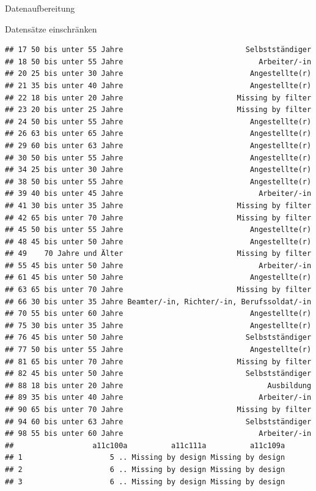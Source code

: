 \documentclass[ignorenonframetext,]{beamer}
\begin{document}
\begin{frame}[fragile]{Datenaufbereitung}
\begin{block}{Datensätze einschränken}
\begin{verbatim}
## 17 50 bis unter 55 Jahre                            Selbstständiger
## 18 50 bis unter 55 Jahre                               Arbeiter/-in
## 20 25 bis unter 30 Jahre                             Angestellte(r)
## 21 35 bis unter 40 Jahre                             Angestellte(r)
## 22 18 bis unter 20 Jahre                          Missing by filter
## 23 20 bis unter 25 Jahre                          Missing by filter
## 24 50 bis unter 55 Jahre                             Angestellte(r)
## 26 63 bis unter 65 Jahre                             Angestellte(r)
## 29 60 bis unter 63 Jahre                             Angestellte(r)
## 30 50 bis unter 55 Jahre                             Angestellte(r)
## 34 25 bis unter 30 Jahre                             Angestellte(r)
## 38 50 bis unter 55 Jahre                             Angestellte(r)
## 39 40 bis unter 45 Jahre                               Arbeiter/-in
## 41 30 bis unter 35 Jahre                          Missing by filter
## 42 65 bis unter 70 Jahre                          Missing by filter
## 45 50 bis unter 55 Jahre                             Angestellte(r)
## 48 45 bis unter 50 Jahre                             Angestellte(r)
## 49    70 Jahre und Älter                          Missing by filter
## 55 45 bis unter 50 Jahre                               Arbeiter/-in
## 61 45 bis unter 50 Jahre                             Angestellte(r)
## 63 65 bis unter 70 Jahre                          Missing by filter
## 66 30 bis unter 35 Jahre Beamter/-in, Richter/-in, Berufssoldat/-in
## 70 55 bis unter 60 Jahre                             Angestellte(r)
## 75 30 bis unter 35 Jahre                             Angestellte(r)
## 76 45 bis unter 50 Jahre                            Selbstständiger
## 77 50 bis unter 55 Jahre                             Angestellte(r)
## 81 65 bis unter 70 Jahre                          Missing by filter
## 82 45 bis unter 50 Jahre                            Selbstständiger
## 88 18 bis unter 20 Jahre                                 Ausbildung
## 89 35 bis unter 40 Jahre                               Arbeiter/-in
## 90 65 bis unter 70 Jahre                          Missing by filter
## 94 60 bis unter 63 Jahre                            Selbstständiger
## 98 55 bis unter 60 Jahre                               Arbeiter/-in
##                  a11c100a          a11c111a          a11c109a
## 1                    5 .. Missing by design Missing by design
## 2                    6 .. Missing by design Missing by design
## 3                    6 .. Missing by design Missing by design

\end{verbatim}
\end{block}
\end{frame}
\end{document}
